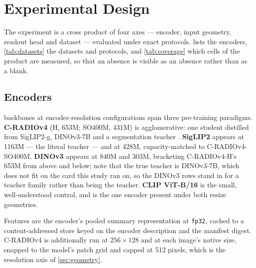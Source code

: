 \section{Experimental Design}\label{sec:setup}
The experiment is a cross product of four axes --- encoder, input geometry, readout head and
dataset --- evaluated under exact protocols.  lists the encoders,
\cref{tab:datasets} the datasets and protocols, and \cref{tab:coverage} which cells of the
product are measured, so that an absence is visible as an absence rather than as a blank.

\begin{table}[t]
\centering
\caption{The encoders. Every checkpoint is frozen: no gradient reaches a backbone anywhere in
this study. \emph{fit} is how an image is made to match the input size --- \texttt{squash}
resizes to the target, \texttt{crop} short-side-resizes and centre-crops. C-RADIOv4 distils
SigLIP2-g, DINOv3 and a segmentation teacher, so rows 1--6 are students of rows 7--10's
families.}
\label{tab:encoders}
\small
\setlength{\tabcolsep}{4pt}

\end{table}

\subsection{Encoders}
\nEncoders{} backbones at \nEncoderConfigs{} encoder-resolution configurations span three
pre-training paradigms. \textbf{C-RADIOv4} (H, 653M; SO400M, 431M) is
agglomerative: one student distilled from SigLIP2-g, DINOv3-7B and a segmentation teacher
\cite{ranzinger2024amradio,heinrich2025radiov25}. \textbf{SigLIP2}
\cite{tschannen2025siglip2} appears at 1163M --- the literal teacher --- and at
428M, capacity-matched to C-RADIOv4-SO400M. \textbf{DINOv3}
\cite{simeoni2025dinov3} appears at 840M and 303M, bracketing C-RADIOv4-H's
653M from above and below; note that the true teacher is DINOv3-7B, which does not fit
on the card this study ran on, so the DINOv3 rows stand in for a teacher family rather than
being the teacher. \textbf{CLIP ViT-B/16} \cite{radford2021clip} is the small, well-understood
control, and is the one encoder present under both resize geometries.

Features are the encoder's pooled summary representation at \texttt{fp32}, cached to a
content-addressed store keyed on the encoder description and the manifest digest. C-RADIOv4 is
additionally run at $256\times128$ and at each image's native size, snapped to the model's
patch grid and capped at 512 pixels, which is the resolution axis of \cref{sec:geometry}.

